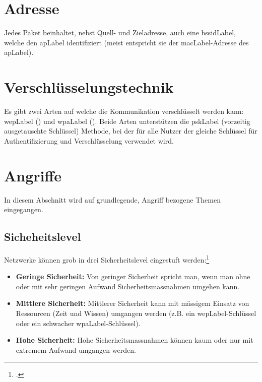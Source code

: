 \section{Adresse}
Jedes Paket beinhaltet, nebst Quell- und Zieladresse, auch eine \gls{bssidLabel}, welche den \gls{apLabel} identifiziert (meist entspricht sie der \gls{macLabel}-Adresse des \gls{apLabel}).


\section{Verschlüsselungstechnik}
Es gibt zwei Arten auf welche die Kommunikation verschlüsselt werden kann: \gls{wepLabel} () und \gls{wpaLabel} ().
Beide Arten unterstützen die \gls{pskLabel} (vorzeitig ausgetauschte Schlüssel) Methode, bei der für alle Nutzer der gleiche Schlüssel für Authentifizierung und Verschlüsselung verwendet wird.


\section{Angriffe}
In diesem Abschnitt wird auf grundlegende, Angriff bezogene Themen eingegangen.

\subsection{Sicheheitslevel}
Netzwerke können grob in drei Sicherheitslevel eingestuft werden:\footcite[][115]{WrightCache201503}
\begin{itemize}
	\item \textbf{Geringe Sicherheit:} Von geringer Sicherheit spricht man, wenn man ohne oder mit sehr geringen Aufwand Sicherheitsmassnahmen umgehen kann.
	\item \textbf{Mittlere Sicherheit:} Mittlerer Sicherheit kann mit mässigem Einsatz von Ressourcen (Zeit und Wissen) umgangen werden (z.B. ein \gls{wepLabel}-Schlüssel oder ein schwacher \gls{wpaLabel}-Schlüssel).
	\item \textbf{Hohe Sicherheit:} Hohe Sicherheitsmassnahmen können kaum oder nur mit extremem Aufwand umgangen werden.
\end{itemize}

